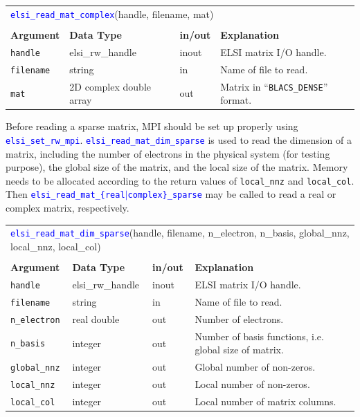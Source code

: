 \documentclass{report}
\newcommand{\api}[1]{\textcolor{blue}{\texttt{#1}}}
\begin{document}
\begin{tabular}[]{|p{20mm}|p{40mm}|p{10mm}|p{92mm}|}
\multicolumn{4}{l}{\api{elsi\_read\_mat\_complex}(handle, filename, mat)}\\
\multicolumn{4}{l}{}\\
\hline
\multicolumn{1}{|l|}{\textbf{Argument}} & \multicolumn{1}{l|}{\textbf{Data Type}} & \multicolumn{1}{l|}{\textbf{in/out}} & \multicolumn{1}{l|}{\textbf{Explanation}}\\
\hline
\texttt{handle}   & elsi\_rw\_handle        & inout & ELSI matrix I/O handle.\\
\hline
\texttt{filename} & string                  & in    & Name of file to read.\\
\hline
\texttt{mat}      & 2D complex double array & out   & Matrix in ``\texttt{BLACS\_DENSE}'' format.\\
\hline
\end{tabular}

Before reading a sparse matrix, MPI should be set up properly using \api{elsi\_set\_rw\_mpi}. \api{elsi\_read\_mat\_dim\_sparse} is used to read the dimension of a matrix, including the number of electrons in the physical system (for testing purpose), the global size of the matrix, and the local size of the matrix. Memory needs to be allocated according to the return values of \texttt{local\_nnz} and \texttt{local\_col}. Then \api{elsi\_read\_mat\_\{real$\vert$complex\}\_sparse} may be called to read a real or complex matrix, respectively.

\begin{tabular}[]{|p{20mm}|p{40mm}|p{10mm}|p{92mm}|}
\multicolumn{4}{l}{\api{elsi\_read\_mat\_dim\_sparse}(handle, filename, n\_electron, n\_basis, global\_nnz, local\_nnz, local\_col)}\\
\multicolumn{4}{l}{}\\
\hline
\multicolumn{1}{|l|}{\textbf{Argument}} & \multicolumn{1}{l|}{\textbf{Data Type}} & \multicolumn{1}{l|}{\textbf{in/out}} & \multicolumn{1}{l|}{\textbf{Explanation}}\\
\hline
\texttt{handle}      & elsi\_rw\_handle & inout & ELSI matrix I/O handle.\\
\hline
\texttt{filename}    & string           & in    & Name of file to read.\\
\hline
\texttt{n\_electron} & real double      & out   & Number of electrons.\\
\hline
\texttt{n\_basis}    & integer          & out   & Number of basis functions, i.e. global size of matrix.\\
\hline
\texttt{global\_nnz} & integer          & out   & Global number of non-zeros.\\
\hline
\texttt{local\_nnz}  & integer          & out   & Local number of non-zeros.\\
\hline
\texttt{local\_col}  & integer          & out   & Local number of matrix columns.\\
\hline
\end{tabular}
\end{document}
